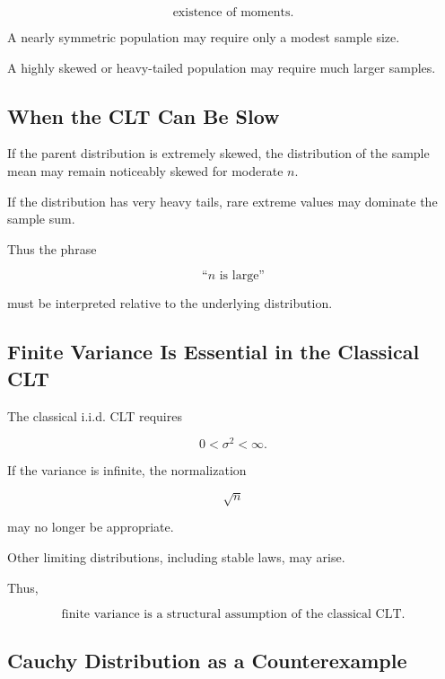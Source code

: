 \[
\text{existence of moments}.
\]

A nearly symmetric population may require only a modest sample size.

A highly skewed or heavy-tailed population may require much larger
samples.

\subsection{When the CLT Can Be Slow}
\label{subsec:slow-clt-convergence}

If the parent distribution is extremely skewed, the distribution of the
sample mean may remain noticeably skewed for moderate \(n\).

If the distribution has very heavy tails, rare extreme values may
dominate the sample sum.

Thus the phrase

\[
\boxed{
\text{``\(n\) is large''}
}
\]

must be interpreted relative to the underlying distribution.

\subsection{Finite Variance Is Essential in the Classical CLT}
\label{subsec:finite-variance-clt}

The classical i.i.d. CLT requires

\[
0<\sigma^2<\infty.
\]

If the variance is infinite, the normalization

\[
\sqrt{n}
\]

may no longer be appropriate.

Other limiting distributions, including stable laws, may arise.

Thus,

\[
\boxed{
\text{finite variance is a structural assumption of the classical CLT}.
}
\]

\subsection{Cauchy Distribution as a Counterexample}
\label{subsec:cauchy-clt-counterexample}


